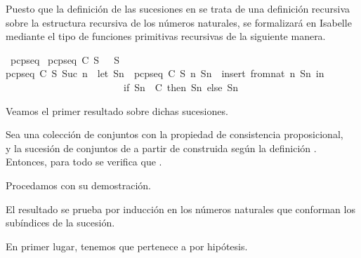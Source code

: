 \begin{isabellebody}
\begin{isamarkuptext}
  Puesto que la definición de las sucesiones en  se trata de una definición 
  recursiva sobre la estructura recursiva de los números naturales, se formalizará en Isabelle
  mediante el tipo de funciones primitivas recursivas de la siguiente manera.%
\end{isamarkuptext}\isamarkuptrue%
\isamarkupfalse%
\ pcp{\isacharunderscore}seq\ \isanewline
{\isachardoublequoteopen}pcp{\isacharunderscore}seq\ C\ S\ {}\ {\isacharequal}\ S{\isachardoublequoteclose}\ {\isacharbar}\isanewline
{\isachardoublequoteopen}pcp{\isacharunderscore}seq\ C\ S\ {\isacharparenleft}Suc\ n{\isacharparenright}\ {\isacharequal}\ {\isacharparenleft}let\ Sn\ {\isacharequal}\ pcp{\isacharunderscore}seq\ C\ S\ n{\isacharsemicolon}\ Sn{}\ {\isacharequal}\ insert\ {\isacharparenleft}from{\isacharunderscore}nat\ n{\isacharparenright}\ Sn\ in\isanewline
\ \ \ \ \ \ \ \ \ \ \ \ \ \ \ \ \ \ \ \ \ \ \ \ if\ Sn{}\ {\isasymin}\ C\ then\ Sn{}\ else\ Sn{\isacharparenright}{\isachardoublequoteclose}%
\begin{isamarkuptext}%
Veamos el primer resultado sobre dichas sucesiones.

  \begin{lema}
    Sea  una colección de conjuntos con la propiedad de consistencia proposicional,\\  y 
     la sucesión de conjuntos de  a partir de  construida según la definición . 
    Entonces, para todo  se verifica que .
  \end{lema}

  Procedamos con su demostración.

  \begin{demostracion}
    El resultado se prueba por inducción en los números naturales que conforman los subíndices de la 
    sucesión.

    En primer lugar, tenemos que  pertenece a  por hipótesis.


\end{demostracion}
\end{isamarkuptext}
\end{isabellebody}

